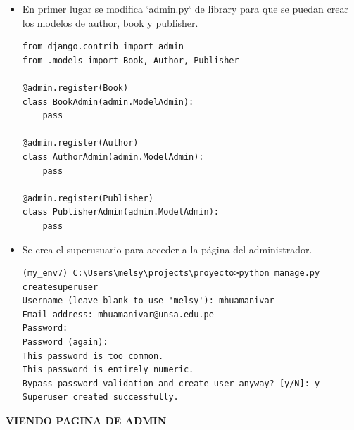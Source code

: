\documentclass{article}
\begin{document}
\vspace{\baselineskip}

\begin{itemize}

\item En primer lugar se modifica `admin.py` de library para que se puedan crear los modelos de author, book y publisher.

\begin{lstlisting}[style=python]
from django.contrib import admin
from .models import Book, Author, Publisher

@admin.register(Book)
class BookAdmin(admin.ModelAdmin):
    pass

@admin.register(Author)
class AuthorAdmin(admin.ModelAdmin):
    pass

@admin.register(Publisher)
class PublisherAdmin(admin.ModelAdmin):
    pass
\end{lstlisting}

\item Se crea el superusuario para acceder a la página del administrador.

\begin{lstlisting}[style=shell]
(my_env7) C:\Users\melsy\projects\proyecto>python manage.py createsuperuser
Username (leave blank to use 'melsy'): mhuamanivar
Email address: mhuamanivar@unsa.edu.pe
Password:
Password (again):
This password is too common.
This password is entirely numeric.
Bypass password validation and create user anyway? [y/N]: y
Superuser created successfully.
\end{lstlisting}

\end{itemize}


\vspace{2\baselineskip}

\pagebreak

\textbf{VIENDO PAGINA DE ADMIN}

\vspace{\baselineskip}
\end{document}
